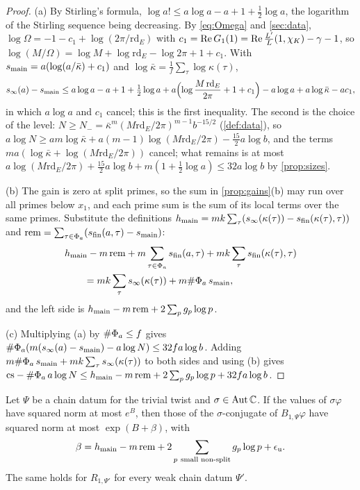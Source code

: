 \begin{proof}
(a) By Stirling's formula, $\log a!\le a\log a-a+1+\frac12\log a$, the logarithm of the Stirling sequence being decreasing. By \eqref{eq:Omega} and \cref{sec:data}, $\log\Omega=-1-c_1+\log(2\pi/\mathrm{rd}_E)$ with $c_1=\operatorname{Re} G_1(1)=\operatorname{Re}\frac{L'}{L}(1,\chi_K)-\gamma-1$, so
$\log(M/\Omega)=\log M+\log\mathrm{rd}_E-\log2\pi+1+c_1$. With $s_{\rm main}=a(\log(a/\bar\kappa)+c_1)$ and $\log\bar\kappa=\frac1f\sum_\tau\log\kappa(\tau)$,
\[
  s_\infty(a)-s_{\rm main}\le a\log a-a+1+\tfrac12\log a+a\Bigl(\log\frac{M\,\mathrm{rd}_E}{2\pi}+1+c_1\Bigr)-a\log a+a\log\bar\kappa-ac_1 ,
\]
in which $a\log a$ and $c_1$ cancel; this is the first inequality. The second is the choice of the level: $N\ge N_-=\bar\kappa^m(M\mathrm{rd}_E/2\pi)^{m-1}b^{-15/2}$ (\cref{def:data}), so $a\log N\ge am\log\bar\kappa+a(m-1)\log(M\mathrm{rd}_E/2\pi)-\frac{15}2a\log b$, and the terms $ma(\log\bar\kappa+\log(M\mathrm{rd}_E/2\pi))$ cancel; what remains is at most
$a\log(M\mathrm{rd}_E/2\pi)+\frac{15}2a\log b+m(1+\frac12\log a)\le32a\log b$ by \cref{prop:sizes}.

(b) The gain is zero at split primes, so the sum in \cref{prop:gains}(b) may run over all primes below $x_1$, and each prime sum is the sum of its local terms over the same primes. Substitute the definitions $h_{\mathrm{main}}=mk\sum_\tau(s_\infty(\kappa(\tau))-s_{\mathrm{fin}}(\kappa(\tau),\tau))$ and $\mathrm{rem}=\sum_{\tau\in\Phi_a}(s_{\mathrm{fin}}(a,\tau)-s_{\rm main})$:
\begin{align*}
  &h_{\mathrm{main}}-m\,\mathrm{rem}+m\sum_{\tau\in\Phi_a}s_{\mathrm{fin}}(a,\tau)+mk\sum_\tau s_{\mathrm{fin}}(\kappa(\tau),\tau)\\
  &\qquad=mk\sum_\tau s_\infty(\kappa(\tau))+m\#\Phi_a\,s_{\rm main},
\end{align*}
and the left side is $h_{\mathrm{main}}-m\,\mathrm{rem}+2\sum_pg_p\log p$.

(c) Multiplying (a) by $\#\Phi_a\le f$ gives $\#\Phi_a(m(s_\infty(a)-s_{\rm main})-a\log N)\le32fa\log b$. Adding $m\#\Phi_a\,s_{\rm main}+mk\sum_\tau s_\infty(\kappa(\tau))$ to both sides and using (b) gives $\mathrm{cs}-\#\Phi_a\,a\log N\le h_{\mathrm{main}}-m\,\mathrm{rem}+2\sum_pg_p\log p+32fa\log b$.
\end{proof}

\begin{theorem}\label{thm:composite-size}
Let $\Psi$ be a chain datum for the trivial twist and $\sigma\in\operatorname{Aut}\mathbb{C}$. If the values of $\sigma\varphi$ have squared norm at most $e^B$, then those of the
$\sigma$-conjugate of $B_{1,\Psi}\varphi$ have squared norm at most $\exp(B+\beta)$, with
\[
  \beta=\hmain-m\,\rem+2\sum_{p\ \text{small non-split}}g_p\log p+\errunit .
\]
The same holds for $R_{1,\Psi'}$ for every weak chain datum $\Psi'$.
\end{theorem}

